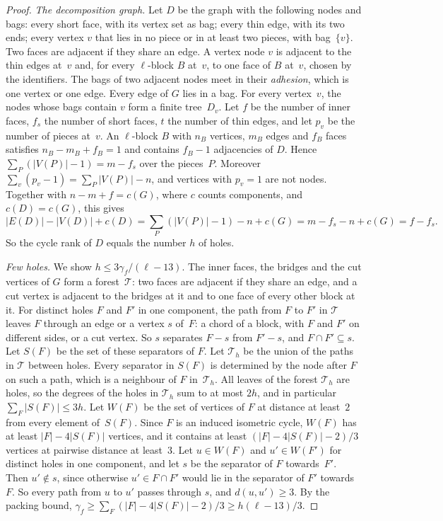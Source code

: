 \documentclass[11pt]{article}
\theoremstyle{remark}
\begin{document}
\begin{proof}
\emph{The decomposition graph.} Let $D$ be the graph with the following nodes and bags: every short
face, with its vertex set as bag; every thin edge, with its two ends; every vertex $v$ that lies in
no piece or in at least two pieces, with bag~$\{v\}$. Two faces are adjacent if they share an edge. A
vertex node $v$ is adjacent to the thin edges at~$v$ and, for every $\ell$-block $B$ at~$v$, to one
face of $B$ at~$v$, chosen by the identifiers. The bags of two adjacent nodes meet in their
\emph{adhesion}, which is one vertex or one edge. Every edge of $G$ lies in a bag. For every vertex~$v$,
the nodes whose bags contain $v$ form a finite tree~$D_v$. Let $f$ be the
number of inner faces, $f_s$ the number of short faces, $t$ the number of thin edges, and let $p_v$ be
the number of pieces at~$v$. An $\ell$-block $B$ with $n_B$ vertices, $m_B$ edges and $f_B$ faces
satisfies $n_B-m_B+f_B=1$ and contains $f_B-1$ adjacencies of $D$. Hence
$\sum_P(|V(P)|-1)=m-f_s$ over the pieces~$P$. Moreover $\sum_v(p_v-1)=\sum_P|V(P)|-n$, and vertices
with $p_v=1$ are not nodes. Together with $n-m+f=c(G)$, where $c$ counts components, and
$c(D)=c(G)$, this gives
\[
  |E(D)|-|V(D)|+c(D)=\sum_P(|V(P)|-1)-n+c(G)=m-f_s-n+c(G)=f-f_s.
\]
So the cycle rank of $D$ equals the number $h$ of holes.

\emph{Few holes.} We show $h\le3\gamma_f/(\ell-13)$. The inner faces, the bridges and the cut vertices
of $G$ form a forest~$\mathcal T$: two faces are adjacent if they share an edge, and a cut vertex is
adjacent to the bridges at it and to one face of every other block at it. For distinct holes $F$ and
$F'$ in one component, the path from $F$ to $F'$ in $\mathcal T$ leaves $F$ through an edge or a
vertex $s$ of~$F$: a chord of a block, with $F$ and $F'$ on different sides, or a cut vertex. So $s$
separates $F-s$ from $F'-s$, and $F\cap F'\subseteq s$. Let $S(F)$ be the set of these separators of
$F$. Let $\mathcal T_h$ be the union of the paths in $\mathcal T$ between holes. Every separator in
$S(F)$ is determined by the node after $F$ on such a path, which is a neighbour of $F$ in~$\mathcal
T_h$. All leaves of the forest $\mathcal T_h$ are holes, so the degrees of the holes in $\mathcal T_h$
sum to at most $2h$, and in particular $\sum_F|S(F)|\le3h$. Let $W(F)$ be the set of vertices of $F$ at distance at least~$2$ from every
element of~$S(F)$. Since $F$ is an induced isometric cycle, $W(F)$ has at least $|F|-4|S(F)|$ vertices,
and it contains at least $(|F|-4|S(F)|-2)/3$ vertices at pairwise distance at least~$3$. Let
$u\in W(F)$ and $u'\in W(F')$ for distinct holes in one component, and let $s$ be the separator of $F$
towards~$F'$. Then $u'\notin s$, since otherwise $u'\in F\cap F'$ would lie in the
separator of $F'$ towards~$F$. So every path from $u$ to $u'$ passes through $s$, and $d(u,u')\ge3$. By
the packing bound, $\gamma_f\ge\sum_F(|F|-4|S(F)|-2)/3\ge h(\ell-13)/3$.


\end{proof}
\end{document}
